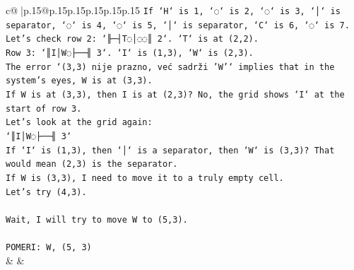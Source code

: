 \documentclass{article}
\begin{document}
{\begin{supertabular}{c@{$\;$}|p{.15\linewidth}@{}p{.15\linewidth}p{.15\linewidth}p{.15\linewidth}p{.15\linewidth}p{.15\linewidth}}
{{{\texttt{If `H` is 1, `◌` is 2, `◌` is 3, `│` is separator, `◌` is 4, `◌` is 5, `│` is separator, `C` is 6, `◌` is 7.} \\
\texttt{Let's check row 2: `╟─┤T◌│◌◌║ 2`. `T` is at (2,2).} \\
\texttt{Row 3: `║I│W◌├──╢ 3`. `I` is (1,3), `W` is (2,3).} \\
\texttt{The error `(3,3) nije prazno, već sadrži 'W'` implies that in the system's eyes, W is at (3,3).} \\
\texttt{If W is at (3,3), then I is at (2,3)? No, the grid shows `I` at the start of row 3.} \\
\texttt{Let's look at the grid again:} \\
\texttt{`║I│W◌├──╢ 3`} \\
\texttt{If `I` is (1,3), then `│` is a separator, then `W` is (3,3)? That would mean (2,3) is the separator.} \\
\texttt{If W is (3,3), I need to move it to a truly empty cell.} \\
\texttt{Let's try (4,3).} \\
\\ 
\texttt{Wait, I will try to move W to (5,3).} \\
\\ 
\texttt{POMERI: W, (5, 3)} \\
            }
        }
    }
    & & \\ \\


\end{supertabular}}
\end{document}
